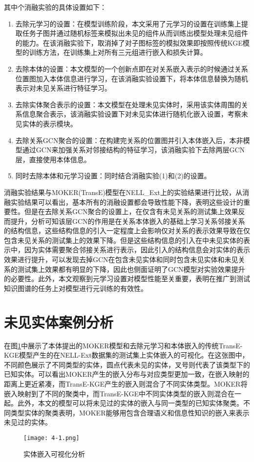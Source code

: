 其中个消融实验的具体设置如下：
\begin{enumerate}[label=\arabic*)]
  \item 去除元学习的设置：在模型训练阶段，本文采用了元学习的设置在训练集上提取任务子图并通过随机标签来模拟出未见的组件从而训练出模型处理未见组件的能力。在该消融实验下，取消掉了对子图标签的模拟效果即按照传统KGE模型的训练方法，在训练集上对所有三元组进行嵌入和损失计算。
  \item 去除本体的设置：本文模型的一个创新点即在对关系嵌入表示的时候通过关系位置图加入本体信息进行学习，在该消融实验设置下，将本体信息替换为随机表示对未见关系进行特征学习。
  \item 去除实体聚合表示的设置：本文模型在处理未见实体时，采用该实体周围的关系信息聚合表示，该消融实验设置下对未见实体进行随机化嵌入设置，考察未见实体的表示模块。
  \item 去除关系GCN聚合的设置：在构建完关系的位置图并引入本体嵌入后，本非模型通过GCN来加强关系对邻接结构的特征学习，该消融实验下去除两层GCN层，直接使用本体信息。
  \item 同时去除本体和元学习设置：同时结合消融实验(1)和(2)的设置。
\end{enumerate}

消融实验结果与MOKER(TransE)模型在NELL\_Ext上的实验结果进行比较，从消融实验结果可以看出，基本所有的消融设置都会导致性能下降，表明这些设计的重要性。但是在去除关系GCN聚合的设置上，在仅含有未见关系的测试集上效果反而提升，分析可知该层GCN的作用是在关系本体嵌入的基础上学习关系邻接关系的结构信息，这些结构信息的引入一定程度上会影响仅对关系的表示效果导致在仅包含未见关系的测试集上的效果下降。但是这些结构信息的引入在中未见实体的表示中，因为实体需要聚合邻接关系进行表示，因此引入的结构信息会对实体的表示效果进行提升，可以发现去掉GCN在包含未见实体和同时包含未见实体和未见关系的测试集上效果都有明显的下降，因此也侧面证明了GCN模型对实验效果提升的必要性。此外，本文观察到元学习设置对模型性能至关重要，表明在推广到测试知识图谱的任务上对模型进行元训练的有效性。

\section{未见实体案例分析}
在图\ref{fig:4-1}中展示了本体提出的MOKER模型和去除元学习和本体嵌入的传统TransE-KGE模型产生的在NELL-Ext数据集的测试集上实体嵌入的可视化。在这张图中，不同颜色展示了不同类型的实体，圆点代表未见的实体，叉号则代表了该类型下的已知实体。可以看出MOKER产生的嵌入分布与对应类型更加一致，在嵌入映射的距离上更近紧凑，而TransE-KGE产生的嵌入则混合了不同实体类型。MOKER将嵌入映射到了不同的聚类中，而TransE-KGE中不同实体类型的嵌入则混合在一起。此外，本文的模型可以将未见过的实体的嵌入与同一类型的已知实体聚类。不同类型实体的聚类表明，MOKER能够用包含合理语义和信息性知识的嵌入来表示未见过的实体。
\begin{figure}[h]
  \centering
  \texttt{[image: 4-1.png]}
  \caption{实体嵌入可视化分析}
  \label{fig:4-1}
\end{figure}

